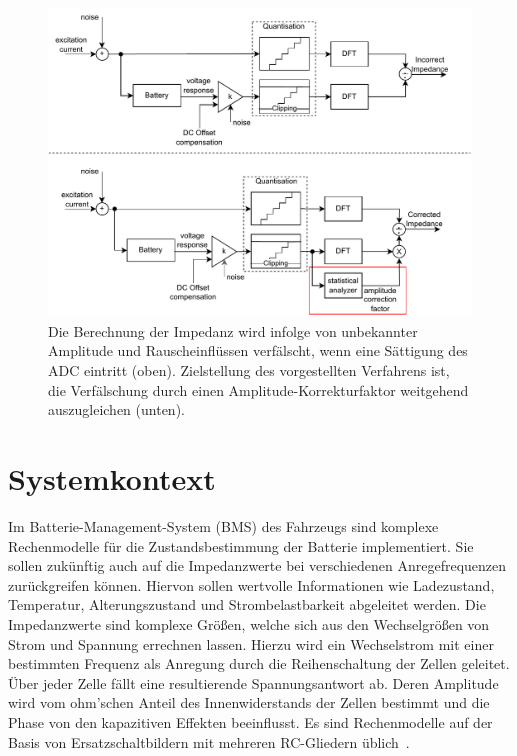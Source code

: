 \begin{figure}[tbh!] 
	\centering 
	\includegraphics[width=1\textwidth]{../img/system.pdf}
	\caption{Die Berechnung der Impedanz wird infolge von unbekannter Amplitude und Rauscheinflüssen verfälscht, wenn eine Sättigung des ADC eintritt (oben). Zielstellung des vorgestellten Verfahrens ist, die Verfälschung durch einen Amplitude-Korrekturfaktor weitgehend auszugleichen (unten).}
	\label{fig:system}
\end{figure}

\section{Systemkontext}
Im Batterie-Management-System (BMS) des Fahrzeugs sind komplexe Rechenmodelle für die Zustandsbestimmung der Batterie implementiert. Sie sollen zukünftig auch auf die Impedanzwerte bei verschiedenen Anregefrequenzen zurückgreifen können. Hiervon sollen wertvolle Informationen wie Ladezustand, Temperatur, Alterungszustand und Strombelastbarkeit abgeleitet werden. Die Impedanzwerte sind komplexe Größen, welche sich aus den Wechselgrößen von Strom und Spannung errechnen lassen. Hierzu wird ein Wechselstrom mit einer bestimmten Frequenz als Anregung durch die Reihenschaltung der Zellen geleitet. Über jeder Zelle fällt eine resultierende Spannungsantwort ab. Deren Amplitude wird vom ohm'schen Anteil des Innenwiderstands der Zellen bestimmt und die Phase von den kapazitiven Effekten beeinflusst. Es sind Rechenmodelle auf der Basis von Ersatzschaltbildern mit mehreren RC-Gliedern üblich~\cite{KeilJossen-2012}.

